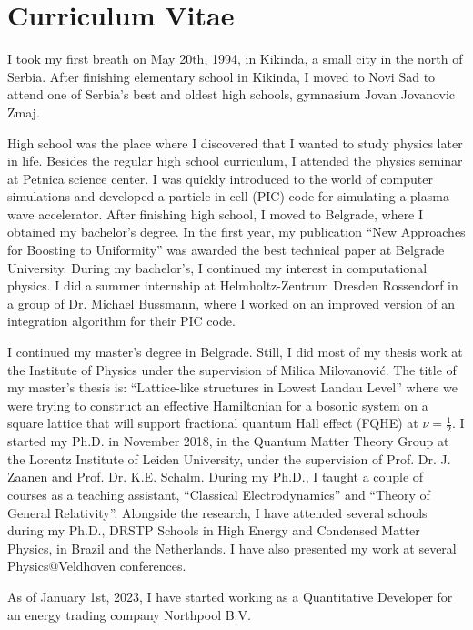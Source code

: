\newpage
\thispagestyle{empty}

\chapter*{Curriculum Vitae} %
\label{Curriculum Vitae}

I took my first breath on May 20th, 1994, in Kikinda, a small city in the north of Serbia. After finishing elementary school in Kikinda, I moved to Novi Sad to attend one of Serbia's best and oldest high schools, gymnasium Jovan Jovanovic Zmaj. 
\par
High school was the place where I discovered that I wanted to study physics later in life. Besides the regular high school curriculum, I attended the physics seminar at Petnica science center. I was quickly introduced to the world of computer simulations and developed a particle-in-cell (PIC) code for simulating a plasma wave accelerator. After finishing high school, I moved to Belgrade, where I obtained my bachelor's degree. In the first year, my publication ``New Approaches for Boosting to Uniformity'' was awarded the best technical paper at Belgrade University. During my bachelor's, I continued my interest in computational physics. I did a summer internship at Helmholtz-Zentrum Dresden Rossendorf in a group of Dr. Michael Bussmann, where I worked on an improved version of an integration algorithm for their PIC code. 
\par
I continued my master's degree in Belgrade. Still, I did most of my thesis work at the Institute of Physics under the supervision of Milica Milovanović. The title of my master's thesis is: ``Lattice-like structures in Lowest Landau Level'' where we were trying to construct an effective Hamiltonian for a bosonic system on a square lattice that will support fractional quantum Hall effect (FQHE) at $\nu=\frac{1}{2}$. I started my Ph.D. in November 2018, in the Quantum Matter Theory Group at the Lorentz Institute of Leiden University, under the supervision of Prof. Dr. J. Zaanen and Prof. Dr. K.E. Schalm. During my Ph.D., I taught a couple of courses as a teaching assistant, ``Classical Electrodynamics'' and ``Theory of General Relativity''. Alongside the research, I have attended several schools during my Ph.D., DRSTP Schools in High Energy and Condensed Matter Physics, in Brazil and the Netherlands. I have also presented my work at several Physics@Veldhoven conferences.

As of January 1st, 2023, I have started working as a Quantitative Developer for an energy trading company Northpool B.V.


\newpage
\thispagestyle{empty}